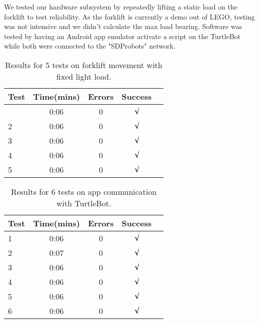 \documentclass{article}
\begin{document}
We tested our hardware subsystem by repeatedly lifting a static load on the forklift to test reliability. As the forklift is currently a demo out of LEGO, testing was not intensive and we didn't calculate the max load bearing.
Software was tested by having an Android app emulator activate a script on the TurtleBot while both were connected to the "SDProbots" network.

\begin{table}[h]
    \vskip 3mm
    \begin{center}
    \begin{small}
    \begin{sc}
    \begin{tabular}{lcccr}
    \hline
    \abovespace\belowspace
    Test  & Time(mins) & Errors & Success \\
    \hline
    \abovespace
    1    & 0:06 & 0 & $\surd$ \\
    2    & 0:06 & 0 & $\surd$\\
    3    & 0:06 & 0 & $\surd$ \\
    4    & 0:06 & 0 & $\surd$\\
    5    & 0:06 & 0 & $\surd$ \\
    \hline
    \end{tabular}
    \end{sc}
    \end{small}
    \caption{Results for 5 tests on forklift movement with fixed light load.}
    \label{tab:sample-table}
    \end{center}
    \vskip -3mm
\end{table}

\begin{table}[h]
    \vskip 3mm
    \begin{center}
    \begin{small}
    \begin{sc}
    \begin{tabular}{lcccr}
    \hline
    \abovespace\belowspace
    Test  & Time(mins) & Errors & Success \\
    \hline
    1    & 0:06 & 0 & $\surd$ \\
    2    & 0:07 & 0 & $\surd$\\
    3    & 0:06 & 0 & $\surd$ \\
    4    & 0:06 & 0 & $\surd$\\
    5    & 0:06 & 0 & $\surd$\\
    6    & 0:06 & 0 & $\surd$ \\
    \hline
    \end{tabular}
    \end{sc}
    \end{small}
    \caption{Results for 6 tests on app communication with TurtleBot.}
    \label{tab:sample-table}
    \end{center}
    \vskip -3mm
\end{table}
\end{document}
